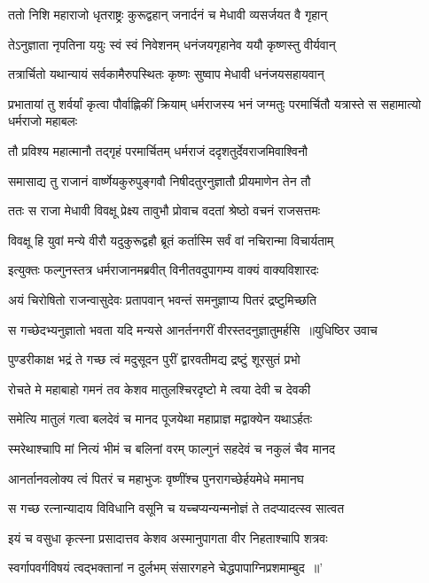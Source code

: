 \twolineshloka
{ततो निशि महाराजो धृतराष्ट्रः कुरूद्वहान्}
{जनार्दनं च मेधावी व्यसर्जयत वै गृहान्}


\twolineshloka
{तेऽनुज्ञाता नृपतिना ययुः स्वं स्वं निवेशनम्}
{धनंजयगृहानेव ययौ कृष्णस्तु वीर्यवान्}


\twolineshloka
{तत्रार्चितो यथान्यायं सर्वकामैरुपस्थितः}
{कृष्णः सुष्वाप मेधावी धनंजयसहायवान्}


\threelineshloka
{प्रभातायां तु शर्वर्यां कृत्वा पौर्वाह्णिकीं क्रियाम्}
{धर्मराजस्य भनं जग्मतुः परमार्चितौ}
{यत्रास्ते स सहामात्यो धर्मराजो महाबलः}


\twolineshloka
{तौ प्रविश्य महात्मानौ तद्गृहं परमार्चितम्}
{धर्मराजं ददृशतुर्देवराजमिवाश्विनौ}


\twolineshloka
{समासाद्य तु राजानं वार्ष्णेयकुरुपुङ्गवौ}
{निषीदतुरनुज्ञातौ प्रीयमाणेन तेन तौ}


\twolineshloka
{ततः स राजा मेधावी विवक्षू प्रेक्ष्य तावुभौ}
{प्रोवाच वदतां श्रेष्ठो वचनं राजसत्तमः}


\twolineshloka
{विवक्षू हि युवां मन्ये वीरौ यदुकुरूद्वहौ}
{ब्रूतं कर्तास्मि सर्वं वां नचिरान्मा विचार्यताम्}


\twolineshloka
{इत्युक्तः फल्गुनस्तत्र धर्मराजानमब्रवीत्}
{विनीतवदुपागम्य वाक्यं वाक्यविशारदः}


\twolineshloka
{अयं चिरोषितो राजन्वासुदेवः प्रतापवान्}
{भवन्तं समनुज्ञाप्य पितरं द्रष्टुमिच्छति}


\threelineshloka
{स गच्छेदभ्यनुज्ञातो भवता यदि मन्यसे}
{आनर्तनगरीं वीरस्तदनुज्ञातुमर्हसि ॥युधिष्ठिर उवाच}
{}


\twolineshloka
{पुण्डरीकाक्ष भद्रं ते गच्छ त्वं मदुसूदन}
{पुरीं द्वारवतीमद्य द्रष्टुं शूरसुतं प्रभो}


\twolineshloka
{रोचते मे महाबाहो गमनं तव केशव}
{मातुलश्चिरदृष्टो मे त्वया देवी च देवकी}


\twolineshloka
{समेत्यि मातुलं गत्वा बलदेवं च मानद}
{पूजयेथा महाप्राज्ञ मद्वाक्येन यथाऽर्हतः}


\twolineshloka
{स्मरेथाश्चापि मां नित्यं भीमं च बलिनां वरम्}
{फाल्गुनं सहदेवं च नकुलं चैव मानद}


\twolineshloka
{आनर्तानवलोक्य त्वं पितरं च महाभुजः}
{वृष्णींश्च पुनरागच्छेर्हयमेधे ममानघ}


\twolineshloka
{स गच्छ रत्नान्यादाय विविधानि वसूनि च}
{यच्चप्यन्यन्मनोज्ञं ते तदप्यादत्स्व सात्वत}


\twolineshloka
{इयं च वसुधा कृत्स्ना प्रसादात्तव केशव}
{अस्मानुपागता वीर निहताश्चापि शत्रवः}


\twolineshloka
{स्वर्गापवर्गविषयं त्वद्भक्तानां न दुर्लभम्}
{संसारगहने चेद्धपापाग्निप्रशमाम्बुद ॥'}



